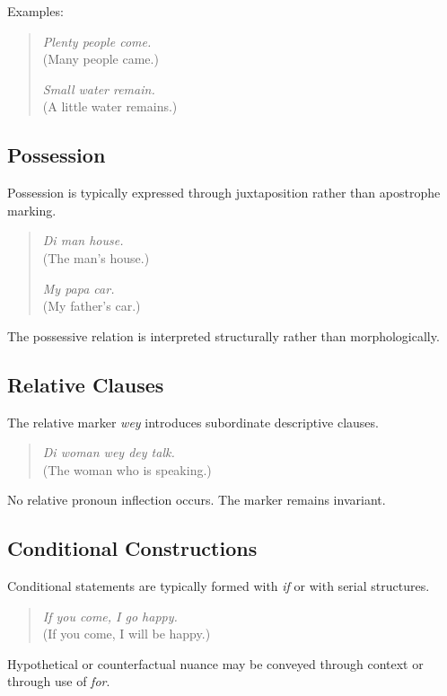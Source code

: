 \documentclass[12pt]{article}
\begin{document}
Examples:

\begin{quote}
\textit{Plenty people come.} \\
(Many people came.)

\textit{Small water remain.} \\
(A little water remains.)
\end{quote}

\subsection{Possession}

Possession is typically expressed through juxtaposition rather than apostrophe marking.

\begin{quote}
\textit{Di man house.} \\
(The man's house.)

\textit{My papa car.} \\
(My father's car.)
\end{quote}

The possessive relation is interpreted structurally rather than morphologically.

\subsection{Relative Clauses}

The relative marker \textit{wey} introduces subordinate descriptive clauses.

\begin{quote}
\textit{Di woman wey dey talk.} \\
(The woman who is speaking.)
\end{quote}

No relative pronoun inflection occurs. The marker remains invariant.

\subsection{Conditional Constructions}

Conditional statements are typically formed with \textit{if} or with serial structures.

\begin{quote}
\textit{If you come, I go happy.} \\
(If you come, I will be happy.)
\end{quote}

Hypothetical or counterfactual nuance may be conveyed through context or through use of \textit{for}.
\end{document}
